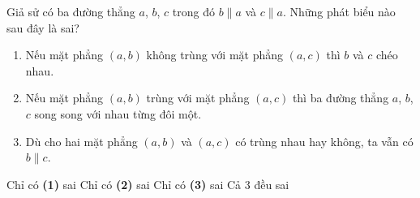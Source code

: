 \begin{ex}%
	Giả sử có ba đường thẳng $a$, $b$, $c$ trong đó $b \parallel a$ và $c \parallel a$. Những phát biểu nào sau đây là sai?
	\begin{enumerate}[\bfseries (1)]
		\item Nếu mặt phẳng $\left(a,b\right)$ không trùng với mặt phẳng $\left(a,c\right)$ thì $b$ và $c$ chéo nhau.
		\item Nếu mặt phẳng $\left(a,b\right)$ trùng với mặt phẳng $\left(a,c\right)$ thì ba đường thẳng $a$, $b$, $c$ song song với nhau từng đôi một.
		\item Dù cho hai mặt phẳng $\left(a, b\right)$ và $\left(a,c\right)$ có trùng nhau hay không, ta vẫn có  $b \parallel c$.
	\end{enumerate}
	\choice
	{Chỉ có \textbf{(1)} sai}
	{Chỉ có \textbf{(2)} sai}
	{Chỉ có \textbf{(3)} sai}
	{\True Cả 3 đều sai}
\end{ex}

